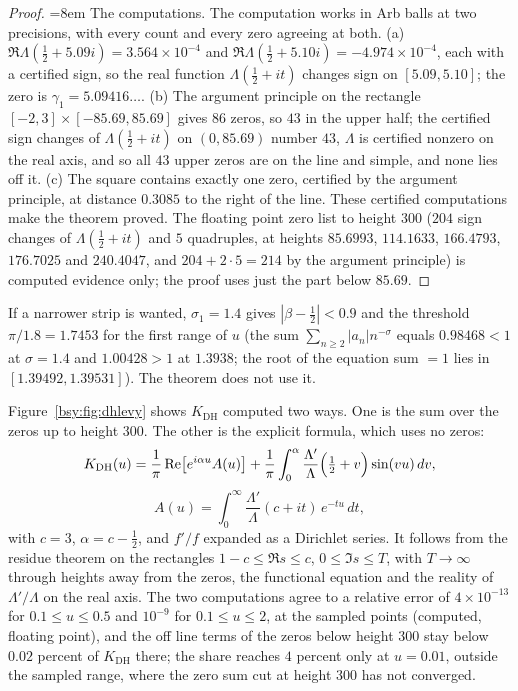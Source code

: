 \begin{proof}
{\emergencystretch=8em The computations. The computation works in Arb balls at two precisions, with every count and every zero agreeing at both. (a) $\Re\Lambda(\frac12+5.09i)=3.564\times10^{-4}$ and $\Re\Lambda(\frac12+5.10i)=-4.974\times10^{-4}$, each with a certified sign, so the real function $\Lambda(\frac12+it)$ changes sign on $[5.09,5.10]$; the zero is $\gamma_1=5.09416\ldots$. (b) The argument principle on the rectangle $[-2,3]\times[-85.69,85.69]$ gives $86$ zeros, so $43$ in the upper half; the certified sign changes of $\Lambda(\frac12+it)$ on $(0,85.69)$ number $43$, $\Lambda$ is certified nonzero on the real axis, and so all $43$ upper zeros are on the line and simple, and none lies off it. (c) The square contains exactly one zero, certified by the argument principle, at distance $0.3085$ to the right of the line. These certified computations make the theorem proved. The floating point zero list to height $300$ ($204$ sign changes of $\Lambda(\frac12+it)$ and $5$ quadruples, at heights $85.6993$, $114.1633$, $166.4793$, $176.7025$ and $240.4047$, and $204+2\cdot5=214$ by the argument principle) is computed evidence only; the proof uses just the part below $85.69$.\par}
\end{proof}

\begin{remark}
If a narrower strip is wanted, $\sigma_1=1.4$ gives $|\beta-\frac12|<0.9$ and the threshold $\pi/1.8=1.7453$ for the first range of $u$ (the sum $\sum_{n\ge2}|a_n|n^{-\sigma}$ equals $0.98468<1$ at $\sigma=1.4$ and $1.00428>1$ at $1.3938$; the root of the equation sum $=1$ lies in $[1.39492,1.39531]$). The theorem does not use it.
\end{remark}

Figure~\ref{bsy:fig:dhlevy} shows $K_{\mathrm{DH}}$ computed two ways. One is the sum over the zeros up to height $300$. The other is the explicit formula, which uses no zeros:
\[
K_{\mathrm{DH}}(u)=\frac1\pi\Re\bigl[e^{i\alpha u}A(u)\bigr]+\frac1\pi\int_0^\alpha\frac{\Lambda'}{\Lambda}\Bigl(\tfrac12+v\Bigr)\sin(vu)\,dv,\]\[
A(u)=\int_0^\infty\frac{\Lambda'}{\Lambda}(c+it)\,e^{-tu}\,dt,
\]
with $c=3$, $\alpha=c-\frac12$, and $f'/f$ expanded as a Dirichlet series. It follows from the residue theorem on the rectangles $1-c\le\Re s\le c$, $0\le\Im s\le T$, with $T\to\infty$ through heights away from the zeros, the functional equation and the reality of $\Lambda'/\Lambda$ on the real axis. The two computations agree to a relative error of $4\times10^{-13}$ for $0.1\le u\le0.5$ and $10^{-9}$ for $0.1\le u\le2$, at the sampled points (computed, floating point), and the off line terms of the zeros below height $300$ stay below $0.02$ percent of $K_{\mathrm{DH}}$ there; the share reaches $4$ percent only at $u=0.01$, outside the sampled range, where the zero sum cut at height $300$ has not converged.

